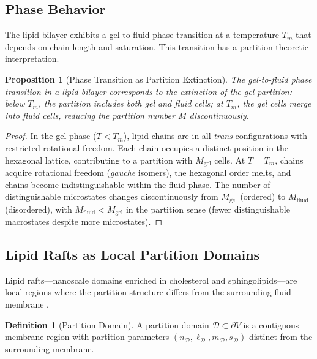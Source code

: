 \documentclass[12pt]{article}
\newtheorem{proposition}[theorem]{Proposition}
\theoremstyle{definition}
\newtheorem{definition}[theorem]{Definition}
\theoremstyle{remark}
\begin{document}
\subsection{Phase Behavior}

The lipid bilayer exhibits a gel-to-fluid phase transition at a temperature $T_m$ that depends on chain length and saturation. This transition has a partition-theoretic interpretation.

\begin{proposition}[Phase Transition as Partition Extinction]
\label{prop:phase_transition}
The gel-to-fluid phase transition in a lipid bilayer corresponds to the extinction of the gel partition: below $T_m$, the partition includes both gel and fluid cells; at $T_m$, the gel cells merge into fluid cells, reducing the partition number $M$ discontinuously.
\end{proposition}

\begin{proof}
In the gel phase ($T < T_m$), lipid chains are in all-\emph{trans} configurations with restricted rotational freedom. Each chain occupies a distinct position in the hexagonal lattice, contributing to a partition with $M_{\mathrm{gel}}$ cells. At $T = T_m$, chains acquire rotational freedom (\emph{gauche} isomers), the hexagonal order melts, and chains become indistinguishable within the fluid phase. The number of distinguishable microstates changes discontinuously from $M_{\mathrm{gel}}$ (ordered) to $M_{\mathrm{fluid}}$ (disordered), with $M_{\mathrm{fluid}} < M_{\mathrm{gel}}$ in the partition sense (fewer distinguishable macrostates despite more microstates).
\end{proof}

\subsection{Lipid Rafts as Local Partition Domains}

Lipid rafts---nanoscale domains enriched in cholesterol and sphingolipids---are local regions where the partition structure differs from the surrounding fluid membrane \cite{singer1972fluid}.

\begin{definition}[Partition Domain]
\label{def:partition_domain}
A partition domain $\mathcal{D} \subset \partial V$ is a contiguous membrane region with partition parameters $(n_{\mathcal{D}}, \ell_{\mathcal{D}}, m_{\mathcal{D}}, s_{\mathcal{D}})$ distinct from the surrounding membrane.
\end{definition}
\end{document}
